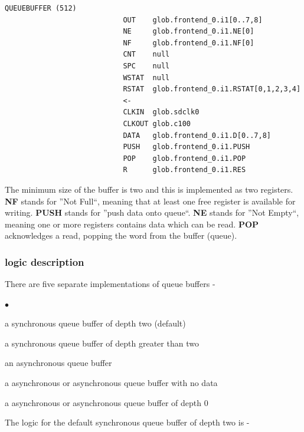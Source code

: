 \documentclass[10pt,a4paper,twoside,fleqn]{book}
\newcommand{\blist}{\begin{list}{$\bullet$}{\setlength{\itemsep}{-5pt}\setlength{\topsep}{-5pt}}}
\newcommand{\blend}{\end{list}}
\begin{document}
                    \begin{lstlisting}[gobble=20, language=tde]
                        QUEUEBUFFER (512)
                            OUT    glob.frontend_0.i1[0..7,8]
                            NE     glob.frontend_0.i1.NE[0]
                            NF     glob.frontend_0.i1.NF[0]
                            CNT    null
                            SPC    null
                            WSTAT  null
                            RSTAT  glob.frontend_0.i1.RSTAT[0,1,2,3,4]
                            <-
                            CLKIN  glob.sdclk0
                            CLKOUT glob.c100
                            DATA   glob.frontend_0.i1.D[0..7,8]
                            PUSH   glob.frontend_0.i1.PUSH
                            POP    glob.frontend_0.i1.POP
                            R      glob.frontend_0.i1.RES
                    \end{lstlisting}

                    The minimum size of the buffer is two and this is implemented as
                    two registers. {\bf NF} stands for ''Not Full``, meaning
                    that at least one free register is available for writing. {\bf
                    PUSH} stands for ''push data onto queue``. {\bf NE}
                    stands for ''Not Empty``, meaning one or more registers contains
                    data which can be read. {\bf POP} acknowledges a read, popping
                    the word from the buffer (queue).

                \subsubsection{logic description}

                    There are five separate implementations of queue buffers -
                    \blist
                    \item   a synchronous queue buffer of depth two (default)
                    \item   a synchronous queue buffer of depth greater than two
                    \item   an asynchronous queue buffer
                    \item   a asynchronous or asynchronous queue buffer with no data
                    \item   a asynchronous or asynchronous queue buffer of depth 0
                    \blend

                    The logic for the default synchronous queue buffer of depth
                    two is -
\end{document}

